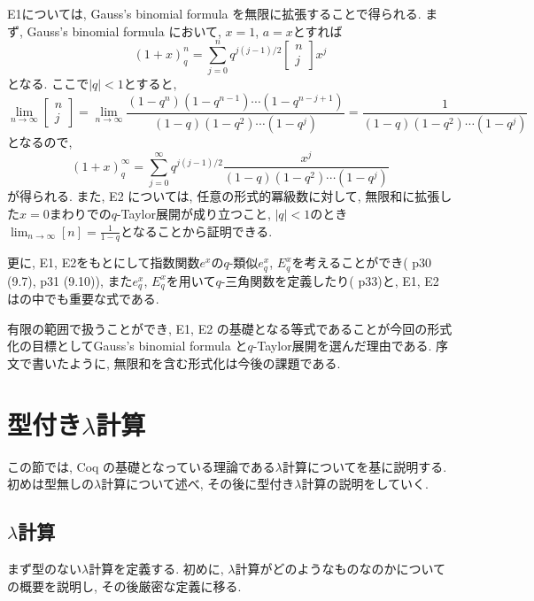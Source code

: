 \documentclass[11pt]{jsreport}
\theoremstyle{mystyle}
\newcommand{\qcoe}[2]{\left[\begin{array}{ccc}#1\\#2\end{array}\right]}
\newcommand{\0}{\textbf{0}}
\begin{document}
E1については, Gauss's binomial formula を無限に拡張することで得られる. 
まず, Gauss's binomial formula において, $x = 1$, $a = x$とすれば
\[
  (1 + x)^n_q = \sum_{j = 0}^n q^{j (j - 1) / 2} \qcoe{n}{j} x^j
\]
となる. ここで$|q| < 1$とすると, 
\[
  \lim_{n \to \infty} \qcoe{n}{j} =
  \lim_{n \to \infty} \frac{(1 - q^n)(1 - q^{n - 1}) \cdots (1 - q^{n - j + 1})}
                                  {(1 - q) (1 - q^2) \cdots (1 - q^j)} =
  \frac{1}{(1 - q) (1 - q^2) \cdots (1 - q^j)}
\]
となるので,  
\[
  (1 + x)^{\infty}_q = \sum_{j = 0}^{\infty} q^{j (j - 1)/2}
  \frac{x^j}{(1 - q) (1 - q^2) \cdots (1 - q^j)}
\]
が得られる. また, E2 については, 任意の形式的冪級数に対して, 無限和に拡張した$x = 0$まわりでの$q$-Taylor展開が成り立つこと, $|q| < 1$のとき$\lim_{n \to \infty} [n] = \frac{1}{1 - q}$となることから証明できる. 

更に, E1, E2をもとにして指数関数$e^x$の$q$-類似$e^x_q$, $E^x_q$を考えることができ(\cite{Kac} p30 (9.7), p31 (9.10)), 
また$e^x_q$, $E^x_q$を用いて$q$-三角関数を定義したり(\cite{Kac} p33)と, E1, E2 は\cite{Kac}の中でも重要な式である. 

有限の範囲で扱うことができ,  E1, E2 の基礎となる等式であることが今回の形式化の目標としてGauss's binomial formula と$q$-Taylor展開を選んだ理由である. 序文で書いたように, 無限和を含む形式化は今後の課題である. 
\section{型付き$\lambda$計算} \label{sec lambda}
この節では, Coq の基礎となっている理論である$\lambda$計算について\cite{Bar}を基に説明する. 初めは型無しの$\lambda$計算について述べ, その後に型付き$\lambda$計算の説明をしていく. 
\subsection{$\lambda$計算} \label{ssec lambdacal}
まず型のない$\lambda$計算を定義する. 初めに, $\lambda$計算がどのようなものなのかについての概要を説明し, その後厳密な定義に移る.
\end{document}
